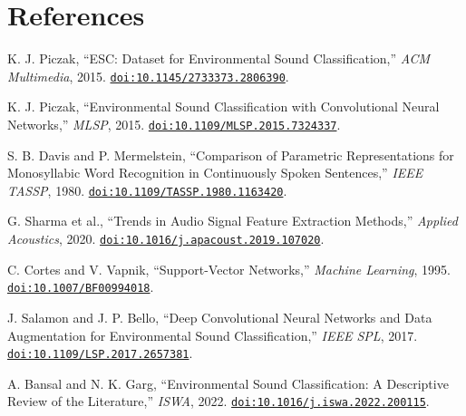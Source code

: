 \documentclass[a4paper,11pt]{article}
\begin{document}
\section{References}
\begingroup
{}
\begin{enumerate}[label={[\arabic*]},widest=12,leftmargin=*,labelsep=0.5em,align=left,itemsep=0.6em,parsep=0pt,topsep=0pt]

\item\label{ref:1} K. J. Piczak, ``ESC: Dataset for Environmental Sound Classification,'' \emph{ACM Multimedia}, 2015. \href{https://doi.org/10.1145/2733373.2806390}{\nolinkurl{doi:10.1145/2733373.2806390}}.

\item\label{ref:2} K. J. Piczak, ``Environmental Sound Classification with Convolutional Neural Networks,'' \emph{MLSP}, 2015. \href{https://doi.org/10.1109/MLSP.2015.7324337}{\nolinkurl{doi:10.1109/MLSP.2015.7324337}}.

\item\label{ref:3} S. B. Davis and P. Mermelstein, ``Comparison of Parametric Representations for Monosyllabic Word Recognition in Continuously Spoken Sentences,'' \emph{IEEE TASSP}, 1980. \href{https://doi.org/10.1109/TASSP.1980.1163420}{\nolinkurl{doi:10.1109/TASSP.1980.1163420}}.

\item\label{ref:4} G. Sharma et al., ``Trends in Audio Signal Feature Extraction Methods,'' \emph{Applied Acoustics}, 2020. \href{https://doi.org/10.1016/j.apacoust.2019.107020}{\nolinkurl{doi:10.1016/j.apacoust.2019.107020}}.

\item\label{ref:5} C. Cortes and V. Vapnik, ``Support-Vector Networks,'' \emph{Machine Learning}, 1995. \href{https://doi.org/10.1007/BF00994018}{\nolinkurl{doi:10.1007/BF00994018}}.

\item\label{ref:6} J. Salamon and J. P. Bello, ``Deep Convolutional Neural Networks and Data Augmentation for Environmental Sound Classification,'' \emph{IEEE SPL}, 2017. \href{https://doi.org/10.1109/LSP.2017.2657381}{\nolinkurl{doi:10.1109/LSP.2017.2657381}}.

\item\label{ref:7} A. Bansal and N. K. Garg, ``Environmental Sound Classification: A Descriptive Review of the Literature,'' \emph{ISWA}, 2022. \href{https://doi.org/10.1016/j.iswa.2022.200115}{\nolinkurl{doi:10.1016/j.iswa.2022.200115}}.


\end{enumerate}
\end{document}
